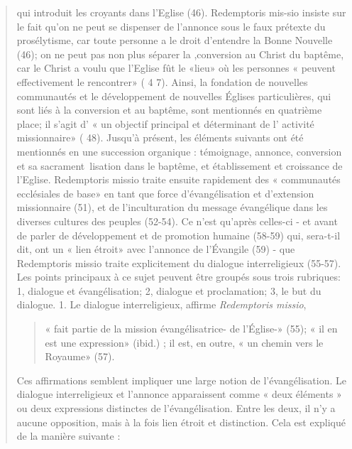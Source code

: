 \begin{quote}
qui introduit les croyants dans l'Eglise (46). Redemptoris mis-sio insiste sur le fait qu'on ne peut se dispenser de l'annonce
sous le faux prétexte du prosélytisme, car toute personne a le
droit d'entendre la Bonne Nouvelle (46); on ne peut pas non
plus séparer la ,conversion au Christ du baptême, car le Christ
a voulu que l'Eglise fût le «lieu» où les personnes « peuvent
effectivement le rencontrer» ( 4 7). Ainsi, la fondation de nouvelles
communautés et le développement de nouvelles Églises
particulières, qui sont liés à la conversion et au baptême, sont
mentionnés en quatrième place; il s'agit d' « un objectif principal
et déterminant de l' activité missionnaire» ( 48).
Jusqu'à présent, les éléments suivants ont été mentionnés en
une succession organique : témoignage, annonce, conversion
et sa sacrament~lisation dans le baptême, et établissement et
croissance de l'Eglise. Redemptoris missio traite ensuite rapidement
des « communautés ecclésiales de base» en tant que
force d'évangélisation et d'extension missionnaire (51), et de
l'inculturation du message évangélique dans les diverses
cultures des peuples (52-54). Ce n'est qu'après celles-ci - et
avant de parler de développement et de promotion humaine
(58-59) qui, sera-t-il dit, ont un « lien étroit» avec l'annonce
de l'Évangile (59) - que Redemptoris missio traite explicitement
du dialogue interreligieux (55-57). Les points principaux
à ce sujet peuvent être groupés sous trois rubriques: 1, dialogue
et évangélisation; 2, dialogue et proclamation; 3, le but du
dialogue.
1. Le dialogue interreligieux, affirme \textit{Redemptoris missio},
\begin{quote}
  « fait partie de la mission évangélisatrice- de l'Église-» (55);
« il en est une expression» (ibid.) ; il est, en outre, « un chemin
vers le Royaume» (57).  
\end{quote}
 Ces affirmations semblent impliquer
une large notion de l'évangélisation. Le dialogue
interreligieux et l'annonce apparaissent comme « deux éléments
» ou deux expressions distinctes de l'évangélisation.
Entre les deux, il n'y a aucune opposition, mais à la fois lien
étroit et distinction. Cela est expliqué de la manière suivante :


\end{quote}
